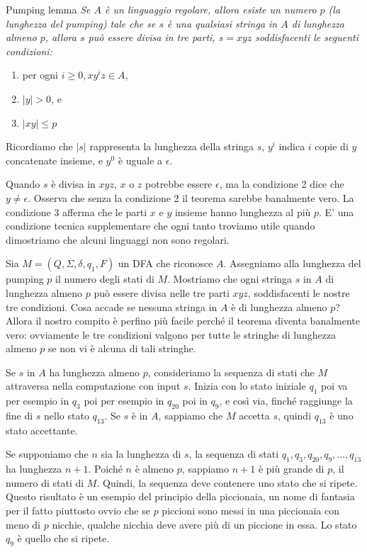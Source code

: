 \begin{Thm}{Pumping lemma}{}
\textit{Se $A$ è un linguaggio regolare, allora esiste un numero $p$ (la lunghezza del pumping) tale che se $s$ è una qualsiasi stringa in $A$ di lunghezza almeno $p$, allora $s$ può essere divisa in tre parti, $s = xyz$ soddisfacenti le seguenti condizioni:}
\begin{enumerate}
    \item per ogni $i \geq 0, xy^iz \in A$,
    \item $|y|>0$, e
    \item $|xy|\leq p$
\end{enumerate}

Ricordiamo che $|s|$ rappresenta la lunghezza della stringa $s$, $y^i$ indica $i$ copie di $y$ concatenate insieme, e $y ^ 0$ è uguale a $\epsilon$.

Quando $s$ è divisa in $xyz$, $x$ o $z$ potrebbe essere $\epsilon$, ma la condizione 2 dice che $y\neq\epsilon$. Osserva che senza la condizione 2 il teorema sarebbe banalmente vero. La condizione 3 afferma che le parti $x$ e $y$ insieme hanno lunghezza al più $p$. E' una condizione tecnica supplementare che ogni tanto troviamo utile quando dimostriamo che alcuni linguaggi non sono regolari.

\begin{osservation}
Sia $M = (Q, \Sigma, \delta, q_{1}, F)$ un DFA che riconosce $A$. Assegniamo alla lunghezza del pumping $p$ il numero degli stati di $M$. Mostriamo che ogni stringa $s$ in $A$ di lunghezza almeno $p$ può essere divisa nelle tre parti $xyz$, soddisfacenti le nostre tre condizioni. Cosa accade se nessuna stringa in $A$ è di lunghezza almeno $p$? Allora il nostro compito è perfino più facile perché il teorema diventa banalmente vero: ovviamente le tre condizioni valgono per tutte le stringhe di lunghezza almeno $p$ se non vi è alcuna di tali stringhe.

Se $s$ in $A$ ha lunghezza almeno $p$, consideriamo la sequenza di stati che $M$ attraversa nella computazione con input $s$. Inizia con lo stato iniziale $q_{1}$ poi va per esempio in $q_{3}$ poi per esempio in $q_{20}$ poi in $q_9$, e così via, finché raggiunge la fine di $s$ nello stato $q_{13}$. Se $s$ è in $A$, sappiamo che $M$ accetta $s$, quindi $q_{13}$ è uno stato accettante.

Se supponiamo che $n$ sia la lunghezza di $s$, la sequenza di stati $q_{1}, q_{3}, q_{20}, q_{9} ,...,q_{13}$ ha lunghezza $n + 1$. Poiché $n$ è almeno $p$, sappiamo $n + 1$ è più grande di $p$, il numero di stati di $M$. Quindi, la sequenza deve contenere uno stato che si ripete. Questo risultato è un esempio del principio della piccionaia, un nome di fantasia per il fatto piuttosto ovvio che se $p$ piccioni sono messi in una piccionaia con meno di $p$ nicchie, qualche nicchia deve avere più di un piccione in essa. Lo stato $q_9$ è quello che si ripete.


\end{osservation}
\end{Thm}
